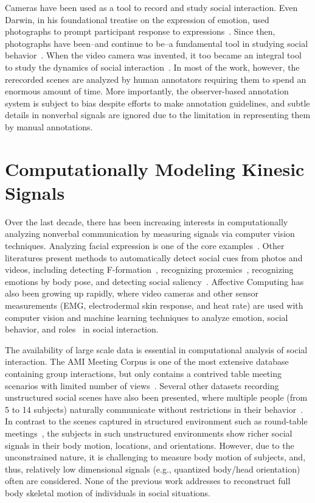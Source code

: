 Cameras have been used as a tool to record and study social interaction. Even Darwin, in his foundational treatise on the expression of emotion, used photographs to prompt participant response to expressions~\cite{Darwin-1872}. Since then, photographs have been--and continue to be--a fundamental tool in studying social behavior~\cite{Hall-1962,Izard-1971,Ekman-1977}. When the video camera was invented, it too became an integral tool to study the dynamics of social interaction~\cite{Muybridge-1887,Yarbus-1967}. In most of the work, however, the rerecorded scenes are analyzed by human annotators requiring them to spend an enormous amount of time. More importantly, the observer-based annotation system is subject to bias despite efforts to make annotation guidelines, and subtle details in nonverbal signals are ignored due to the limitation in representing them by manual annotations. 


\section{Computationally Modeling Kinesic Signals}
Over the last decade, there has been increasing interests in computationally analyzing nonverbal communication by measuring signals via computer vision techniques.  Analyzing facial expression is one of the core examples~\cite{ChuDC13, Torre15, shan2009facial}. Other literatures present methods to automatically detect social cues from photos and videos, including detecting F-formation~\cite{setti2015f}, recognizing proxemics~\cite{yang2012recognizing}, recognizing emotions by body pose\cite{schindler2008recognizing}, and detecting social saliency~\cite{park20123d}. Affective Computing has also been growing up rapidly, where video cameras and other sensor measurements (EMG, electrodermal skin response, and heat rate) are used with computer vision and machine learning techniques to analyze emotion, social behavior, and roles~\cite{picard1997affective} in social interaction. 

The availability of large scale data is essential in computational analysis of social interaction. The AMI Meeting Corpus is one of the most extensive database containing group interactions, but only contains a contrived table meeting scenarios with limited number of views~\cite{carletta2005ami}. Several other datasets recording unstructured social scenes have also been presented, where multiple people (from 5 to 14 subjects) naturally communicate without restrictions in their behavior~\cite{Zen-10,Cristani-11,SALSA-15}. In contrast to the scenes captured in structured environment such as round-table meetings~\cite{carletta2005ami, Lepri-12}, the subjects in such unstructured environments show richer social signals in their body motion, locations, and orientations. However, due to the unconstrained nature, it is challenging to measure body motion of subjects, and, thus, relatively low dimensional signals (e.g., quantized body/head orientation) often are considered. None of the previous work addresses to reconstruct full body skeletal motion of individuals in social situations.




